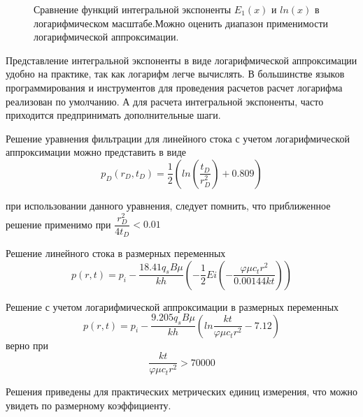 \begin{figure}[h!]
	\begin{center}
		\caption{Сравнение функций интегральной экспоненты $E_1(x)$ и $ln(x)$ в логарифмическом масштабе.Можно оценить диапазон применимости логарифмической аппроксимации.}
		\label{ris:ei3}
	\end{center}
\end{figure}

Представление интегральной экспоненты в виде логарифмической аппроксимации удобно на практике, так как логарифм легче вычислять. В большинстве языков программирования и инструментов для проведения расчетов расчет логарифма реализован по умолчанию. А для расчета интегральной экспоненты, часто приходится предпринимать дополнительные шаги.

Решение уравнения фильтрации для линейного стока с учетом логарифмической аппроксимации можно представить в виде 
$$ p_D(r_D,t_D) = \frac{1}{2} \left( ln \left( \dfrac{ t_D }{r_D^2}  \right) +0.809 \right) $$

при использовании данного уравнения, следует помнить, что приближенное решение применимо при $\dfrac{r_D^2}{4t_D} < 0.01$

Решение линейного стока в размерных переменных
$$ p\left(r,t\right)=p_i-\frac{18.41q_sB\mu}{kh}\left(-\frac{1}{2}Ei\left(-\frac{\varphi\mu c_tr^2}{0.00144kt}\right)\right) $$

Решение с учетом логарифмической аппроксимации в размерных переменных
$$ p\left(r,t\right)=p_i-\frac{9.205q_sB\mu}{kh}\left(ln{\frac{kt}{\varphi\mu c_tr^2}}-7.12\right)$$
верно при 
$$\frac{kt}{\varphi\mu c_tr^2}>70000 $$

Решения приведены для практических метрических единиц измерения, что можно увидеть по размерному коэффициенту. 

